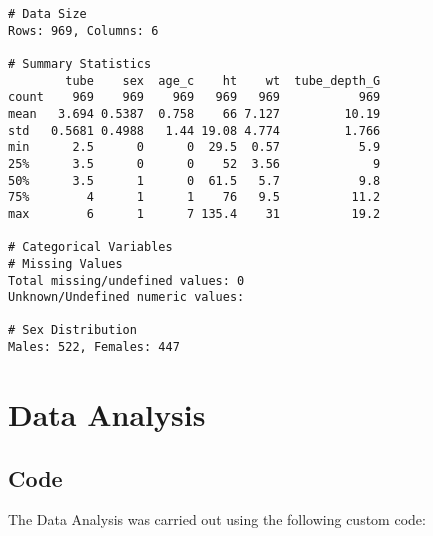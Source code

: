 \documentclass[11pt]{article}
\begin{document}
\begin{Verbatim}[tabsize=4]
# Data Size
Rows: 969, Columns: 6

# Summary Statistics
        tube    sex  age_c    ht    wt  tube_depth_G
count    969    969    969   969   969           969
mean   3.694 0.5387  0.758    66 7.127         10.19
std   0.5681 0.4988   1.44 19.08 4.774         1.766
min      2.5      0      0  29.5  0.57           5.9
25%      3.5      0      0    52  3.56             9
50%      3.5      1      0  61.5   5.7           9.8
75%        4      1      1    76   9.5          11.2
max        6      1      7 135.4    31          19.2

# Categorical Variables
# Missing Values
Total missing/undefined values: 0
Unknown/Undefined numeric values:

# Sex Distribution
Males: 522, Females: 447

\end{Verbatim}

\section{Data Analysis}
\subsection{{Code}}
The Data Analysis was carried out using the following custom code:
\end{document}
